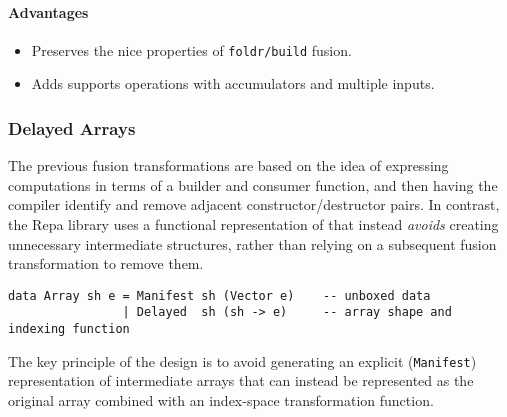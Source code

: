 \paragraph{Advantages}
\begin{itemize}
    \item Preserves the nice properties of \texttt{foldr/build} fusion.
    \item Adds supports operations with accumulators and multiple inputs.
\end{itemize}

%


\subsubsection{Delayed Arrays}

The previous fusion transformations are based on the idea of expressing
computations in terms of a builder and consumer function, and then having the
compiler identify and remove adjacent constructor/destructor pairs. In contrast,
the Repa \cite{Keller:2010} library uses a functional representation of
 that instead \emph{avoids} creating unnecessary
intermediate structures, rather than relying on a subsequent fusion
transformation to remove them.

\begin{lstlisting}[style=Haskell,numbers=none,mathescape=true,caption={Repa-1 style array definition}]
data Array sh e = Manifest sh (Vector e)    -- unboxed data
                | Delayed  sh (sh -> e)     -- array shape and indexing function
\end{lstlisting}

The key principle of the design is to avoid generating an explicit
(\texttt{Manifest}) representation of intermediate arrays that can instead be
represented as the original array combined with an index-space transformation
function.


